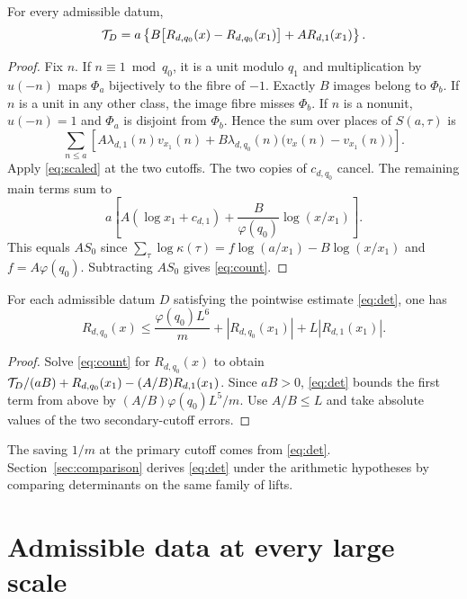 \begin{proposition}\label{prop:count}
For every admissible datum,
\begin{equation}
 \mathcal T_D=a\left\{B\big[R_{d,q_0}(x)-R_{d,q_0}(x_1)\big]+A R_{d,1}(x_1)\right\}.
 \label{eq:count}
\end{equation}
\end{proposition}
\begin{proof}
Fix $n$. If $n\equiv1\bmod q_0$, it is a unit modulo $q_1$ and multiplication by $u(-n)$ maps $\Phi_a$ bijectively to the fibre of $-1$. Exactly $B$ images belong to $\Phi_b$. If $n$ is a unit in any other class, the image fibre misses $\Phi_b$. If $n$ is a nonunit, $u(-n)=1$ and $\Phi_a$ is disjoint from $\Phi_b$. Hence the sum over places of $S(a,\tau)$ is
\[
 \sum_{n\le a}\left[A\lambda_{d,1}(n)v_{x_1}(n)
    +B\lambda_{d,q_0}(n)\big(v_x(n)-v_{x_1}(n)\big)\right].
\]
Apply \eqref{eq:scaled} at the two cutoffs. The two copies of $c_{d,q_0}$ cancel. The remaining main terms sum to
\[
 a\left[A(\log x_1+c_{d,1})
       +\frac{B}{\varphi(q_0)}\log(x/x_1)\right].
\]
This equals $AS_0$ since $\sum_{\tau}\log\kappa(\tau)=f\log(a/x_1)-B\log(x/x_1)$ and $f=A\varphi(q_0)$. Subtracting $AS_0$ gives \eqref{eq:count}.
\end{proof}

\begin{corollary}\label{cor:one}
For each admissible datum $D$ satisfying the pointwise estimate \eqref{eq:det}, one has
\begin{equation}
 R_{d,q_0}(x)\le\frac{\varphi(q_0)L^6}{m}
               +|R_{d,q_0}(x_1)|+L|R_{d,1}(x_1)|.\label{eq:one}
\end{equation}
\end{corollary}
\begin{proof}
Solve \eqref{eq:count} for $R_{d,q_0}(x)$ to obtain
$\mathcal T_D/(aB)+R_{d,q_0}(x_1)-(A/B)R_{d,1}(x_1)$. Since $aB>0$, \eqref{eq:det} bounds the first term from above by $(A/B)\varphi(q_0)L^5/m$. Use $A/B\le L$ and take absolute values of the two secondary-cutoff errors.
\end{proof}

The saving $1/m$ at the primary cutoff comes from \eqref{eq:det}. Section~\ref{sec:comparison} derives \eqref{eq:det} under the arithmetic hypotheses by comparing determinants on the same family of lifts.

\section{Admissible data at every large scale}\label{sec:data-supply}


